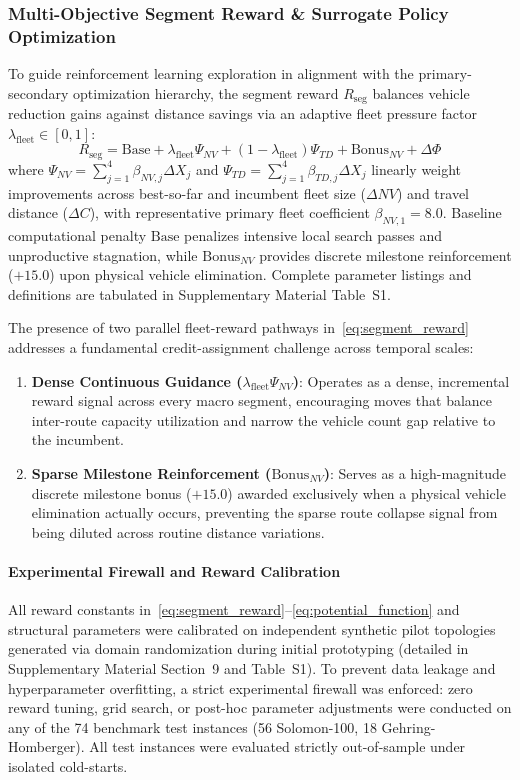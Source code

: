 \documentclass{ieeeaccess}
\begin{document}
\subsubsection{Multi-Objective Segment Reward \& Surrogate Policy Optimization}
To guide reinforcement learning exploration in alignment with the primary-secondary optimization hierarchy, the segment reward $R_{\text{seg}}$ balances vehicle reduction gains against distance savings via an adaptive fleet pressure factor $\lambda_{\text{fleet}} \in [0, 1]$:
\begin{equation}
  R_{\text{seg}} = \text{Base} + \lambda_{\text{fleet}} \Psi_{NV} + (1 - \lambda_{\text{fleet}}) \Psi_{TD} + \text{Bonus}_{NV} + \Delta \Phi
  \label{eq:segment_reward}
\end{equation}
where $\Psi_{NV} = \sum_{j=1}^4 \beta_{NV, j} \Delta X_j$ and $\Psi_{TD} = \sum_{j=1}^4 \beta_{TD, j} \Delta X_j$ linearly weight improvements across best-so-far and incumbent fleet size ($\Delta NV$) and travel distance ($\Delta C$), with representative primary fleet coefficient $\beta_{NV, 1} = 8.0$. Baseline computational penalty $\text{Base}$ penalizes intensive local search passes and unproductive stagnation, while $\text{Bonus}_{NV}$ provides discrete milestone reinforcement ($+15.0$) upon physical vehicle elimination. Complete parameter listings and definitions are tabulated in Supplementary Material Table~S1.

The presence of two parallel fleet-reward pathways in~\eqref{eq:segment_reward} addresses a fundamental credit-assignment challenge across temporal scales:
\begin{enumerate}
    \item \textbf{Dense Continuous Guidance ($\lambda_{\text{fleet}} \Psi_{NV}$)}: Operates as a dense, incremental reward signal across every macro segment, encouraging moves that balance inter-route capacity utilization and narrow the vehicle count gap relative to the incumbent.
    \item \textbf{Sparse Milestone Reinforcement ($\text{Bonus}_{NV}$)}: Serves as a high-magnitude discrete milestone bonus ($+15.0$) awarded exclusively when a physical vehicle elimination actually occurs, preventing the sparse route collapse signal from being diluted across routine distance variations.
\end{enumerate}

\paragraph{Experimental Firewall and Reward Calibration}
All reward constants in~\eqref{eq:segment_reward}--\eqref{eq:potential_function} and structural parameters were calibrated on independent synthetic pilot topologies generated via domain randomization during initial prototyping (detailed in Supplementary Material Section~9 and Table~S1). To prevent data leakage and hyperparameter overfitting, a strict experimental firewall was enforced: zero reward tuning, grid search, or post-hoc parameter adjustments were conducted on any of the 74 benchmark test instances (56 Solomon-100, 18 Gehring-Homberger). All test instances were evaluated strictly out-of-sample under isolated cold-starts.
\end{document}
